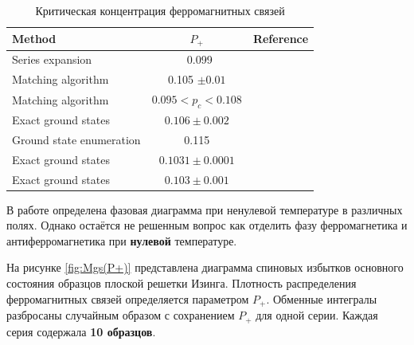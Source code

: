 \documentclass[utf8, babel, sor, jor, amsmath, amssymb, reprint]{elsarticle} %
\begin{document}
\begin{table}[!h]
	\begin{tabular}{|l|c|l|}
		\hline
		Method                                   & $P_{+}$                                       & Reference                                           
		\\ \hline
		Series expansion 								& ~0.099                                  & \cite{PhysRevB.19.260}    \\ \hline
	     Matching algorithm                            & 
	     0.105 $\pm 0.01$                                        & \cite{H_Freund_1989} \\ \hline
		Matching algorithm                      & 
		$0.095<p_c<0.108$                                          & \cite{BENDISCH1994139}      \\ \hline
		Exact ground states                       & 
		$0.106 \pm 0.002$                               & \cite{N.Kawashima_1997}     \\ \hline
		Ground state enumeration                             & 0.115                                          & \cite{PhysRevE.58.1502} \\ \hline
    	Exact ground states        & 
		$0.1031\pm0.0001$                                          & \cite{WANG200331}   \\ \hline
		Exact ground states   & $0.103\pm0.001$                                       & \cite{amoruso2004domain} 
		    \\ \hline
			
	\end{tabular}
	\label{tab:lit_phase}
	\caption{Критическая концентрация ферромагнитных связей}
\end{table}

В работе \cite{trukhin4855337thermodynamic} определена фазовая диаграмма при ненулевой температуре в различных полях. Однако остаётся не решенным вопрос как отделить фазу ферромагнетика и антиферромагнетика при \textbf{нулевой} температуре.

На рисунке \ref{fig:Mgs(P+)} представлена диаграмма спиновых избытков основного состояния образцов плоской решетки Изинга. Плотность распределения ферромагнитных связей определяется параметром $P_+$. Обменные интегралы разбросаны случайным образом с сохранением $P_+$ для одной серии. Каждая серия содержала \textbf{10 образцов}. 
\end{document}
